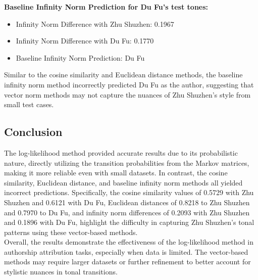 \documentclass[12pt]{article}
\begin{document}
\textbf{Baseline Infinity Norm Prediction for Du Fu's test tones:}
\begin{itemize}
    \item Infinity Norm Difference with Zhu Shuzhen: 0.1967
    \item Infinity Norm Difference with Du Fu: 0.1770
    \item Baseline Infinity Norm Prediction: Du Fu
\end{itemize}

\noindent Similar to the cosine similarity and Euclidean distance methods, the baseline infinity norm method incorrectly predicted Du Fu as the author, suggesting that vector norm methods may not capture the nuances of Zhu Shuzhen's style from small test cases.

\subsection*{Conclusion}

The log-likelihood method provided accurate results due to its probabilistic nature, directly utilizing the transition probabilities from the Markov matrices, making it more reliable even with small datasets. In contrast, the cosine similarity, Euclidean distance, and baseline infinity norm methods all yielded incorrect predictions. Specifically, the cosine similarity values of 0.5729 with Zhu Shuzhen and 0.6121 with Du Fu, Euclidean distances of 0.8218 to Zhu Shuzhen and 0.7970 to Du Fu, and infinity norm differences of 0.2093 with Zhu Shuzhen and 0.1896 with Du Fu, highlight the difficulty in capturing Zhu Shuzhen's tonal patterns using these vector-based methods.
\\
Overall, the results demonstrate the effectiveness of the log-likelihood method in authorship attribution tasks, especially when data is limited. The vector-based methods may require larger datasets or further refinement to better account for stylistic nuances in tonal transitions.
\end{document}
